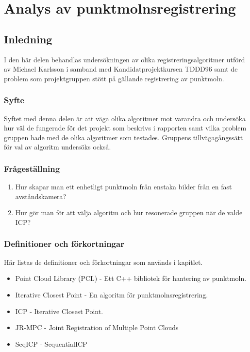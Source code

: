 \chapter{Analys av punktmolnsregistrering}
\label{cha:indiv-report-karlsson}


\section{Inledning}
\label{sec:introduction-karlsson}

I den här delen behandlas undersökningen av olika registreringsalgoritmer utförd av Michael Karlsson i samband med Kandidatprojektkursen TDDD96 samt de problem som projektgruppen stött på gällande registrering av punktmoln.

\subsection{Syfte}
\label{sec:purpose-karlsson}

Syftet med denna delen är att väga olika algoritmer mot varandra och undersöka hur väl de fungerade för det projekt som beskrivs i rapporten samt vilka problem gruppen hade med de olika algoritmer som testades. Gruppens tillvägagångssätt för val av algoritm undersöks också.


\subsection{Frågeställning}
\label{sec:issue-karlsson}

\begin{enumerate}
	\item Hur skapar man ett enhetligt punktmoln från enstaka bilder från en fast \newline avståndskamera?
	\item Hur gör man för att välja algoritm och hur resonerade gruppen när de valde ICP?	
\end{enumerate}

\subsection{Definitioner och förkortningar}
\label{sec:definitions-acronyms-karlsson}

Här listas de definitioner och förkortningar som används i kapitlet.

\begin{itemize}
	\item Point Cloud Library (PCL) \cite{pcl_home} - Ett C++ bibliotek för hantering av punktmoln.
	\item Iterative Closest Point - En algoritm för punktmolnsregistrering.
	\item ICP - Iterative Closest Point.
	\item JR-MPC - Joint Registration of Multiple Point Clouds
	\item SeqICP - SequentialICP
\end{itemize}


